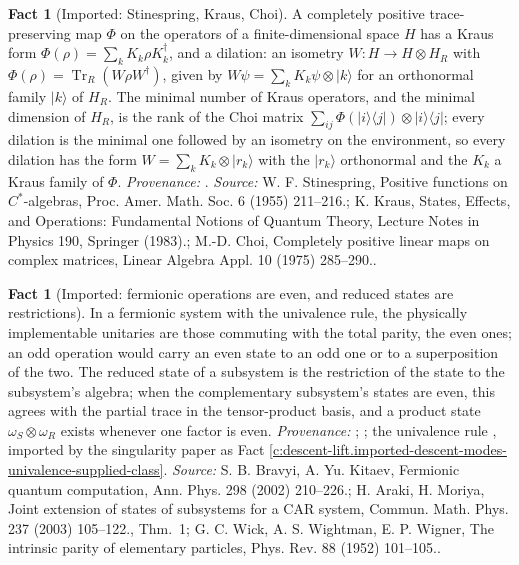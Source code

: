\documentclass[11pt]{article}
\theoremstyle{definition}
\newtheorem{fact}[theorem]{Fact}
\theoremstyle{plain}
\providecommand{\Tr}{}\renewcommand{\Tr}{\operatorname{Tr}}
\providecommand{\bra}{}\renewcommand{\bra}[1]{\langle #1|}
\providecommand{\ket}{}\renewcommand{\ket}[1]{|#1\rangle}
\begin{document}
\begin{fact}[Imported: Stinespring, Kraus, Choi]\label{c:descent-lift.imported-stinespring-kraus-choi}
A completely positive trace-preserving map $\Phi$ on the operators of a finite-dimensional space $H$ has a Kraus form $\Phi(\rho) = \sum_{k} K_{k}\rho K_{k}^{\dagger}$, and a dilation: an isometry $W : H \to H \otimes H_{R}$ with $\Phi(\rho) = \Tr_{R}(W\rho W^{\dagger})$, given by $W\psi = \sum_{k} K_{k}\psi \otimes \ket{k}$ for an orthonormal family $\ket{k}$ of $H_{R}$. The minimal number of Kraus operators, and the minimal dimension of $H_{R}$, is the rank of the Choi matrix $\sum_{ij}\Phi(\ket{i}\bra{j}) \otimes \ket{i}\bra{j}$; every dilation is the minimal one followed by an isometry on the environment, so every dilation has the form $W = \sum_{k} K_{k} \otimes \ket{r_{k}}$ with the $\ket{r_{k}}$ orthonormal and the $K_{k}$ a Kraus family of $\Phi$. \emph{Provenance:} \cite{Stinespring1955, Kraus1983, Choi1975}.
\emph{Source:} W. F. Stinespring, Positive functions on $C^*$-algebras, Proc. Amer. Math. Soc. 6 (1955) 211--216.; K. Kraus, States, Effects, and Operations: Fundamental Notions of Quantum Theory, Lecture Notes in Physics 190, Springer (1983).; M.-D. Choi, Completely positive linear maps on complex matrices, Linear Algebra Appl. 10 (1975) 285--290..
\end{fact}

\begin{fact}[Imported: fermionic operations are even, and reduced states are restrictions]\label{c:descent-lift.imported-fermionic-operations-are-even-reduced}
In a fermionic system with the univalence rule, the physically implementable unitaries are those commuting with the total parity, the even ones; an odd operation would carry an even state to an odd one or to a superposition of the two. The reduced state of a subsystem is the restriction of the state to the subsystem's algebra; when the complementary subsystem's states are even, this agrees with the partial trace in the tensor-product basis, and a product state $\omega_{S} \otimes \omega_{R}$ exists whenever one factor is even. \emph{Provenance:} \cite{BravyiKitaev2002}; \cite[Thm.~1]{ArakiMoriya2003}; the univalence rule \cite{WWW1952}, imported by the singularity paper as Fact \ref{c:descent-lift.imported-descent-modes-univalence-supplied-class}.
\emph{Source:} S. B. Bravyi, A. Yu. Kitaev, Fermionic quantum computation, Ann. Phys. 298 (2002) 210--226.; H. Araki, H. Moriya, Joint extension of states of subsystems for a CAR system, Commun. Math. Phys. 237 (2003) 105--122., Thm.~1; G. C. Wick, A. S. Wightman, E. P. Wigner, The intrinsic parity of elementary particles, Phys. Rev. 88 (1952) 101--105..
\end{fact}
\end{document}
